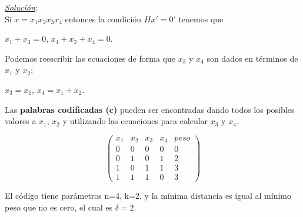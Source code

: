 \documentclass{beamer}
\theoremstyle{plain}
\theoremstyle{example}
\newtheorem{ejercicio} [Ejercicio]{Ejercicio}
\theoremstyle{example}
\begin{document}
\begin{frame}  \footnotesize 

\textit{\underline{Solución}}:\\

Si $x = x_1x_2x_3x_4$ entonces la condición $Hx' = 0'$ tenemos que  

\begin{center}
$x_1 +x_3 =0$,	$x_1 +x_2 +x_4 =0.$
\end{center}

Podemos reescribir las ecuaciones de forma que $x_3$ y $x_4$ son dados en términos de $x_1$ y $x_2$:

\begin{center}
$x_3 = x_1$,	$x_4 = x_1 + x_2$.
\end{center}

Las \textbf{palabras codificadas (c)}  pueden ser encontradas dando todos los posibles valores a $x_1$, $x_2$ y utilizando las ecuaciones para calcular $x_3$ y $x_4$.

\[
        \left( \begin{array}{ccccc}
                  x_1 & x_2 & x_3 & x_4 & peso\\
                      0 &   0   &   0  &    0 &	0\\ 
					  0 &   1   &   0  &    1 &	2\\ 
					  1 &   0   &   1  &    1 &	3\\ 
					  1 &   1   &   1  &    0 &	3
           			\end{array}
    		\right) 	    		
\]

El código tiene parámetros n=4, k=2, y la mínima distancia es igual al mínimo peso que no es cero, el cual es $\delta =2$.


\end{frame} 

\end{document}
